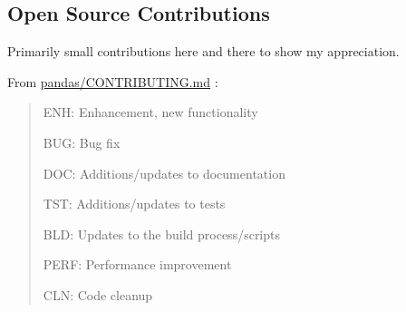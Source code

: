 \documentclass[letter,,openany,oneside]{sphinxhowto}
\begin{document}
\subsection{Open Source Contributions}
\label{resume:open-source-contributions}
Primarily small contributions here and there to show my appreciation.

From \href{https://github.com/pydata/pandas/blob/master/CONTRIBUTING.md\#pull-requests}{pandas/CONTRIBUTING.md} :
\begin{quote}

\begin{DUlineblock}{0em}
\item[] ENH: Enhancement, new functionality
\item[] BUG: Bug fix
\item[] DOC: Additions/updates to documentation
\item[] TST: Additions/updates to tests
\item[] BLD: Updates to the build process/scripts
\item[] PERF: Performance improvement
\item[] CLN: Code cleanup
\end{DUlineblock}
\end{quote}
\end{document}
